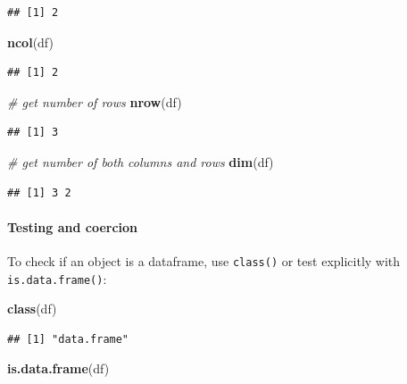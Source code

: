 \documentclass[
]{book}
\newenvironment{Shaded}{\begin{snugshade}}{\end{snugshade}}
\newcommand{\CommentTok}[1]{\textcolor[rgb]{0.56,0.35,0.01}{\textit{#1}}}
\newcommand{\FunctionTok}[1]{\textcolor[rgb]{0.13,0.29,0.53}{\textbf{#1}}}
\newcommand{\NormalTok}[1]{#1}
\begin{document}
\begin{verbatim}
## [1] 2
\end{verbatim}

\begin{Shaded}
\begin{Highlighting}[]
\FunctionTok{ncol}\NormalTok{(df)}
\end{Highlighting}
\end{Shaded}

\begin{verbatim}
## [1] 2
\end{verbatim}

\begin{Shaded}
\begin{Highlighting}[]
\CommentTok{\# get number of rows}
\FunctionTok{nrow}\NormalTok{(df)}
\end{Highlighting}
\end{Shaded}

\begin{verbatim}
## [1] 3
\end{verbatim}

\begin{Shaded}
\begin{Highlighting}[]
\CommentTok{\# get number of both columns and rows}
\FunctionTok{dim}\NormalTok{(df)}
\end{Highlighting}
\end{Shaded}

\begin{verbatim}
## [1] 3 2
\end{verbatim}

\paragraph{Testing and coercion}\label{testing-and-coercion}

To check if an object is a dataframe, use \texttt{class()} or test explicitly with \texttt{is.data.frame()}:

\begin{Shaded}
\begin{Highlighting}[]
\FunctionTok{class}\NormalTok{(df)}
\end{Highlighting}
\end{Shaded}

\begin{verbatim}
## [1] "data.frame"
\end{verbatim}

\begin{Shaded}
\begin{Highlighting}[]
\FunctionTok{is.data.frame}\NormalTok{(df)}
\end{Highlighting}
\end{Shaded}
\end{document}
